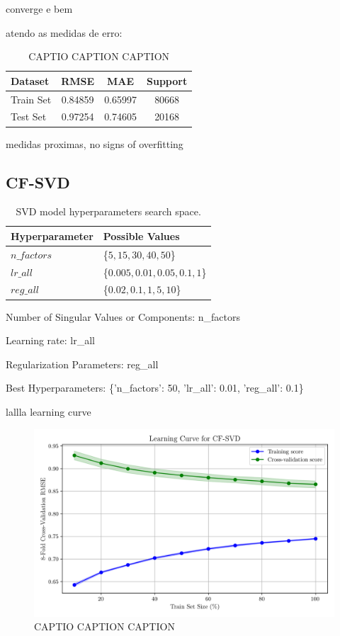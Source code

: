 \documentclass[conference]{IEEEtran}
\begin{document}
converge e bem

atendo as medidas de erro:

\begin{table}[H]
\centering
\caption{CAPTIO CAPTION CAPTION}
\label{tab:model03_results}
\begin{tabular}{lccc}
\toprule
\textbf{Dataset} & \textbf{RMSE} & \textbf{MAE} & \textbf{Support} \\
\midrule
Train Set & 0.84859 & 0.65997 & 80668 \\
Test Set & 0.97254 & 0.74605 & 20168 \\
\bottomrule
\end{tabular}
\end{table}

medidas proximas, no signs of overfitting

\subsection{CF-SVD}

\begin{table}[H]
\centering
\caption{SVD model hyperparameters search space.}
\label{parametrosSVD}
\begin{tabular}{ll}
\toprule
\textbf{Hyperparameter} & \textbf{Possible Values} \\
\midrule
$n\_factors$ & \{$5,15,30,40,50$\} \\ 
$lr\_all$ & \{$0.005, 0.01, 0.05, 0.1, 1$\} \\ 
$reg\_all$ & \{$0.02,0.1,1,5,10$\} \\ 
\bottomrule
\end{tabular}
\end{table}


Number of Singular Values or Components: n\_factors

Learning rate: lr\_all

Regularization Parameters: reg\_all

Best Hyperparameters: \{'n\_factors': 50, 'lr\_all': 0.01, 'reg\_all': 0.1\}

lallla learning curve

\begin{figure}[H]
    \centering
    \includegraphics[width=1\linewidth]{assets/model03_learningcurve.png}
    \caption{CAPTIO CAPTION CAPTION}
    \label{fig:model03_learningcurve}
\end{figure}
\end{document}
